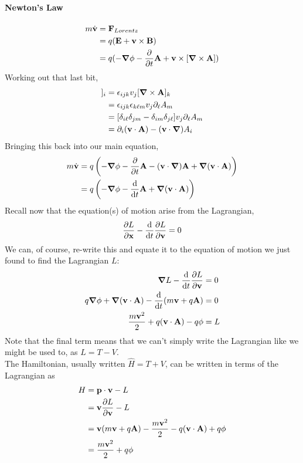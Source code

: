 \documentclass[a4paper]{article}
\begin{document}
\paragraph{Newton's Law}
\begin{align*}
	m\dot{\vec{v}} &= \vec{F}_{Lorentz}\\
		       &= q(\vec{E} + \vec{v}\times\vec{B})\\
		       &= q(-\del\phi-\pd{t}\vec{A}+
				\vec{v}\times[\del\times\vec{A}])\\
\end{align*}
Working out that last bit,
\begin{align*}
	[\vec{v}\times[\del\times\vec{A}]]_i
		&= \epsilon_{ijk}v_j[\del\times\vec{A}]_k\\
		&= \epsilon_{ijk}\epsilon_{k\ell m}v_j\partial_\ell A_m\\
		&= [\delta_{i\ell}\delta_{jm}-\delta_{im}\delta_{j\ell}]
			v_j\partial_\ell A_m\\
		&= \partial_i(\vec{v}\cdot\vec{A}) - (\vec{v}\cdot\del)A_i
\end{align*}
Bringing this back into our main equation,
\begin{align*}
	m\dot{\vec{v}} &= q\left(-\del\phi-\pd{t}\vec{A}-
		(\vec{v}\cdot\del)\vec{A}+\del(\vec{v}\cdot\vec{A})\right)\\
	&= q\left(-\del\phi-\der{}{t}\vec{A} + \del(\vec{v}\cdot\vec{A})\right)
\end{align*}
Recall now that the equation(s) of motion arise from the Lagrangian,
\[ \frac{\partial L}{\partial \boldsymbol{\mathbf{x}}} - \frac{\mathrm{d} }{\mathrm{d} t}\frac{\partial L}{\partial \boldsymbol{\mathbf{v}}} = 0 \]
We can, of course, re-write this and equate it to the equation of motion we
just found to find the Lagrangian $L$:
\begin{align*}
	\boldsymbol{\mathbf{\nabla}} L - \frac{\mathrm{d} }{\mathrm{d} t}\frac{\partial L}{\partial \boldsymbol{\mathbf{v}}} &= 0\\
	q\boldsymbol{\mathbf{\nabla}}\phi+\boldsymbol{\mathbf{\nabla}}(\boldsymbol{\mathbf{v}}\cdot\boldsymbol{\mathbf{A}})-\frac{\mathrm{d} }{\mathrm{d} t}(m\boldsymbol{\mathbf{v}}+q\boldsymbol{\mathbf{A}})&=0\\
	\frac{m\boldsymbol{\mathbf{v}}^2}{2} + q(\boldsymbol{\mathbf{v}}\cdot\boldsymbol{\mathbf{A}})-q\phi &= L
\end{align*}
Note that the final term means that we can't simply write the Lagrangian
like we might be used to, as $L = T - V$.\\
The Hamiltonian, usually written $\hat{H} = T + V$, can be written in terms
of the Lagrangian as
\begin{align*}
	H &= \boldsymbol{\mathbf{p}}\cdot\boldsymbol{\mathbf{v}} - L\\
	  &= \boldsymbol{\mathbf{v}}\frac{\partial L}{\partial \boldsymbol{\mathbf{v}}} - L\\
	  &= \boldsymbol{\mathbf{v}}(m\boldsymbol{\mathbf{v}}+q\boldsymbol{\mathbf{A}}) - \frac{m\boldsymbol{\mathbf{v}}^2}{2} -
		q(\boldsymbol{\mathbf{v}}\cdot\boldsymbol{\mathbf{A}}) + q\phi\\
	  &= \frac{m\boldsymbol{\mathbf{v}}^2}{2} + q\phi
\end{align*}
\end{document}
